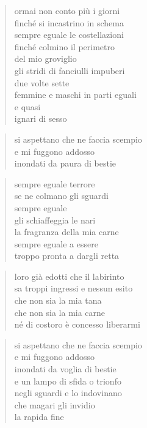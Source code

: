 	\begin{verse}
		ormai non conto più i giorni\\
		finché si incastrino in schema\\
		sempre eguale le costellazioni\\
		finché colmino il perimetro\\
		del mio groviglio\\
		gli stridi di fanciulli impuberi\\
		due volte sette\\
		femmine e maschi in parti eguali\\
		e quasi\\
		ignari di sesso
	\end{verse}

	\begin{verse}
		si aspettano che ne faccia scempio\\
		e mi fuggono addosso\\
		inondati da paura di bestie
	\end{verse}

	\begin{verse}
		sempre eguale terrore\\
		se ne colmano gli sguardi\\
		sempre eguale\\
		gli schiaffeggia le nari\\
		la fragranza della mia carne\\
		sempre eguale a essere\\
		troppo pronta a dargli retta
	\end{verse}

	\begin{verse}
		loro già edotti che il labirinto\\
		sa troppi ingressi e nessun esito\\
		che non sia la mia tana\\
		che non sia la mia carne\\
		né di costoro è concesso liberarmi
	\end{verse}

	\begin{verse}
		si aspettano che ne faccia scempio\\
		e mi fuggono addosso\\
		inondati da voglia di bestie\\
		e un lampo di sfida o trionfo\\
		negli sguardi e lo indovinano\\
		che magari gli invidio\\
		la rapida fine
	\end{verse}

